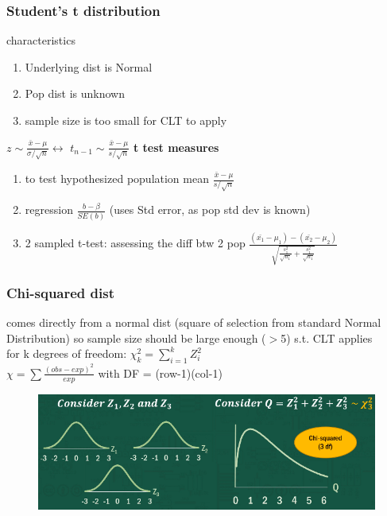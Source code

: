 \documentclass{beamer}
\begin{document}
\begin{frame}\frametitle{Student's t distribution}
characteristics\\
\begin{enumerate}
\item Underlying dist is Normal
\item Pop dist is unknown
\item sample size is too small for CLT to apply
\end{enumerate}
$z \sim \frac{\bar{x}-\mu}{\sigma/\sqrt{n}} \longleftrightarrow$
$t_{n-1} \sim \frac{\bar{x}-\mu}{s/\sqrt{n}} $	
\textbf{t test measures}
\begin{enumerate}
\item to test hypothesized population mean $\frac{\bar{x}-\mu}{s/\sqrt{n}}$
\item regression $\frac{b-\beta}{SE(b)}$ (uses Std error, as pop std dev is known)
\item 2 sampled t-test: assessing the diff btw 2 pop 
$\frac{(\bar{x_1}-\mu_1)-(\bar{x_2}-\mu_2)}
{\sqrt{\frac{s_1^2}{\sqrt{n_1}}+\frac{s_1^2}{\sqrt{n_1}}}}$
\end{enumerate}
\end{frame}

\begin{frame}\frametitle{Chi-squared dist}
comes directly from a normal dist (square of selection from standard Normal Distribution) so sample size should be large enough ($>$5) s.t. CLT applies\\
for k degrees of freedom: $\chi_k^2 = \sum_{i=1}^{k}Z_i^2$\\
$\chi = \sum\frac{(obs-exp)^2}{exp}$ with
DF = (row-1)(col-1)\\
\begin{figure}
\includegraphics[scale=0.5]{chisq}
\end{figure}
\end{frame}
\end{document}
